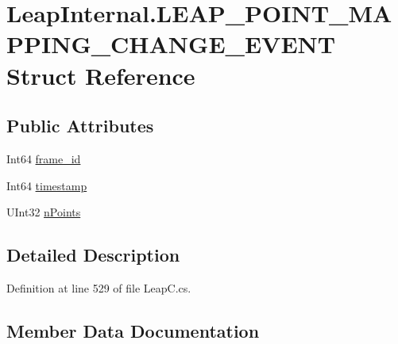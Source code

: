 \hypertarget{struct_leap_internal_1_1_l_e_a_p___p_o_i_n_t___m_a_p_p_i_n_g___c_h_a_n_g_e___e_v_e_n_t}{}\section{Leap\+Internal.\+L\+E\+A\+P\+\_\+\+P\+O\+I\+N\+T\+\_\+\+M\+A\+P\+P\+I\+N\+G\+\_\+\+C\+H\+A\+N\+G\+E\+\_\+\+E\+V\+E\+NT Struct Reference}
\label{struct_leap_internal_1_1_l_e_a_p___p_o_i_n_t___m_a_p_p_i_n_g___c_h_a_n_g_e___e_v_e_n_t}
\subsection*{Public Attributes}
\begin{DoxyCompactItemize}
\item 
Int64 \mbox{\hyperlink{struct_leap_internal_1_1_l_e_a_p___p_o_i_n_t___m_a_p_p_i_n_g___c_h_a_n_g_e___e_v_e_n_t_ad5847ff7d9ba477d073669191c875afe}{frame\+\_\+id}}
\item 
Int64 \mbox{\hyperlink{struct_leap_internal_1_1_l_e_a_p___p_o_i_n_t___m_a_p_p_i_n_g___c_h_a_n_g_e___e_v_e_n_t_a83040469eb5f71dc25b60b2c7f03885c}{timestamp}}
\item 
U\+Int32 \mbox{\hyperlink{struct_leap_internal_1_1_l_e_a_p___p_o_i_n_t___m_a_p_p_i_n_g___c_h_a_n_g_e___e_v_e_n_t_a8b47a857ceb31bba6487f500752aaf93}{n\+Points}}
\end{DoxyCompactItemize}


\subsection{Detailed Description}


Definition at line 529 of file Leap\+C.\+cs.



\subsection{Member Data Documentation}
\mbox{\label{struct_leap_internal_1_1_l_e_a_p___p_o_i_n_t___m_a_p_p_i_n_g___c_h_a_n_g_e___e_v_e_n_t_ad5847ff7d9ba477d073669191c875afe}} 
